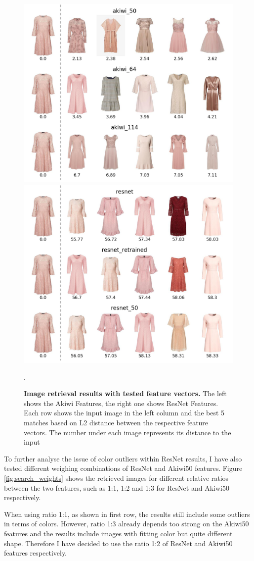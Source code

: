 \documentclass[12pt]{report}
\begin{document}
\begin{figure}[h]
\centering
{\includegraphics[width=.48\linewidth]{04_experiments/retrieval/akiwi_pink}}\hspace{0.2cm}
{\includegraphics[width=.48\linewidth]{04_experiments/retrieval/resnet_pink}}
\caption{\label{fig:search_pink} \textbf{Image retrieval results with tested feature vectors.} The left shows the Akiwi Features, the right one shows ResNet Features. Each row shows the input image in the left column and the best 5 matches based on L2 distance between the respective feature vectors. The number under each image represents its distance to the input}.
\end{figure}

To further analyse the issue of color outliers within ResNet results, I have also tested different weighing combinations of ResNet and Akiwi50 features. Figure \ref{fig:search_weights} shows the retrieved images for different relative ratios between the two features, such as 1:1, 1:2 and 1:3 for ResNet and Akiwi50 respectively. 

When using ratio 1:1, as shown in first row, the results still include some outliers in terms of colors. However, ratio 1:3 already depends too strong on the Akiwi50 features and the results include images with fitting color but quite different shape. Therefore I have decided to use the ratio 1:2 of ResNet and Akiwi50 features respectively.
\end{document}
